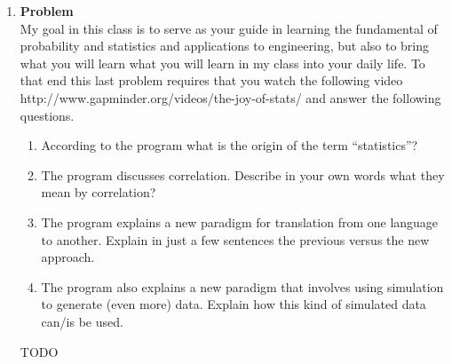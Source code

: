 \documentclass[12pt]{article}
\newenvironment{Ex}{\textbf{Problem}\vspace{.75em}\\}{}
\begin{document}
\begin{enumerate}
\begin{Ex}
\begin{enumerate}
      ratio of two integers, say $i/j$ where $i, j \in \{1, 2, 3,
      \ldots\}$. Hint: Find a way to visualize the rationals as a
      2-dimensional array, then think about how you can linearly
      enumerate the elements in that array.
    \item Suppose $A$ and $B$ are countable. Argue that the union $A
      \cup B$ is also countable.
    \item Consider the set $A$ containing all infinite sequences of 0s
      and 1s, e.g., $a = 10101010101\ldots$ is an element in
      $A$. Argue that $A$ is not countable. Hint: You can argue this
      by contradiction. Suppose you had an enumeration of all elements
      (sequences) in $A$, i.e., $a_1, a_2,\ldots$. Construct a
      sequence $a^∗$ which is not in the list. For example, $a^∗$ may
      differ from ai in the $i\text{th}$ digit for each $i = 1, 2,
      \ldots$. This is called a diagonal argument.
    \item Based on the claim made in the previous question, argue that
      the real numbers in $[0, 1]$ are uncountable.
    \end{enumerate}
    \begin{solution} \hfill
      {\huge TODO}
    \end{solution}
  \end{Ex}
\item 
  \begin{Ex}
    My goal in this class is to serve as your guide in learning the
    fundamental of probability and statistics and applications to
    engineering, but also to bring what you will learn what you will
    learn in my class into your daily life. To that end this last
    problem requires that you watch the following video
    http://www.gapminder.org/videos/the-joy-of-stats/ and answer the
    following questions.
    \begin{enumerate}
    \item According to the program what is the origin of the term
      ``statistics''?
    \item The program discusses correlation. Describe in your own
      words what they mean by correlation?
    \item The program explains a new paradigm for translation from one
      language to another. Explain in just a few sentences the
      previous versus the new approach.
    \item The program also explains a new paradigm that involves using
      simulation to generate (even more) data. Explain how this kind
      of simulated data can/is be used.
    \end{enumerate}
    \begin{solution} \hfill
      {\huge TODO}
    \end{solution}
  \end{Ex}
\end{enumerate}
\end{document}

